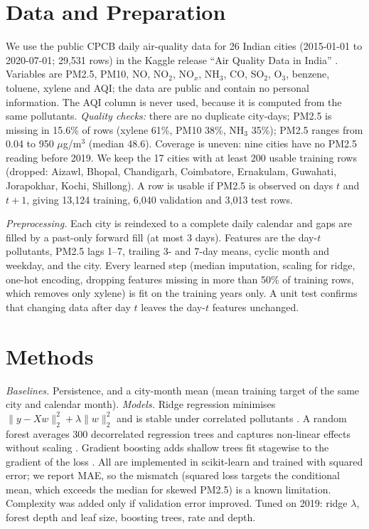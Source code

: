 \documentclass{article}
\begin{document}
\section{Data and Preparation}
We use the public CPCB daily air-quality data for 26 Indian cities (2015-01-01 to 2020-07-01; 29,531 rows) in the Kaggle release ``Air Quality Data in India'' \citep{rao}. Variables are PM2.5, PM10, NO, NO$_2$, NO$_x$, NH$_3$, CO, SO$_2$, O$_3$, benzene, toluene, xylene and AQI; the data are public and contain no personal information. The AQI column is never used, because it is computed from the same pollutants. \emph{Quality checks:} there are no duplicate city-days; PM2.5 is missing in 15.6\% of rows (xylene 61\%, PM10 38\%, NH$_3$ 35\%); PM2.5 ranges from 0.04 to 950 $\mu$g/m$^3$ (median 48.6). Coverage is uneven: nine cities have no PM2.5 reading before 2019. We keep the 17 cities with at least 200 usable training rows (dropped: Aizawl, Bhopal, Chandigarh, Coimbatore, Ernakulam, Guwahati, Jorapokhar, Kochi, Shillong). A row is usable if PM2.5 is observed on days $t$ and $t{+}1$, giving 13,124 training, 6,040 validation and 3,013 test rows.

\emph{Preprocessing.} Each city is reindexed to a complete daily calendar and gaps are filled by a past-only forward fill (at most 3 days). Features are the day-$t$ pollutants, PM2.5 lags 1--7, trailing 3- and 7-day means, cyclic month and weekday, and the city. Every learned step (median imputation, scaling for ridge, one-hot encoding, dropping features missing in more than 50\% of training rows, which removes only xylene) is fit on the training years only. A unit test confirms that changing data after day $t$ leaves the day-$t$ features unchanged.

\section{Methods}
\emph{Baselines.} Persistence, and a city-month mean (mean training target of the same city and calendar month). \emph{Models.} Ridge regression minimises $\|y-Xw\|_2^2+\lambda\|w\|_2^2$ and is stable under correlated pollutants \citep{hoerl}. A random forest averages 300 decorrelated regression trees and captures non-linear effects without scaling \citep{breiman}. Gradient boosting adds shallow trees fit stagewise to the gradient of the loss \citep{friedman}. All are implemented in scikit-learn \citep{sklearn} and trained with squared error; we report MAE, so the mismatch (squared loss targets the conditional mean, which exceeds the median for skewed PM2.5) is a known limitation. Complexity was added only if validation error improved. Tuned on 2019: ridge $\lambda$, forest depth and leaf size, boosting trees, rate and depth.
\end{document}
